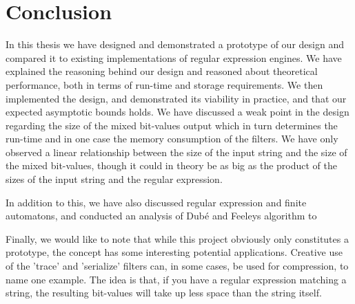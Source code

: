 \section{Conclusion}
\label{sec:conclusion}

In this thesis we have designed and demonstrated a prototype of our design and
compared it to existing implementations of regular expression
engines. We have explained the reasoning behind our design and reasoned about 
theoretical performance, both in terms of run-time and storage requirements. We then
implemented the design, and demonstrated its viability in practice, and that our expected asymptotic bounds holds. 
We have discussed a weak point in the design regarding the size of
the mixed bit-values output which in turn determines the run-time and in
one case the memory consumption of the filters. We have only observed
a linear relationship between the size of the input string and the
size of the mixed bit-values, though it could in theory be as big as
the product of the sizes of the input string and the regular
expression. 

In addition to this, we have also discussed regular expression and finite automatons, and conducted an analysis of Dub\'{e} and Feeleys algorithm to 

Finally, we would like to note that while this project obviously only constitutes a prototype, the concept has some interesting potential applications. Creative use of the 'trace' and 'serialize' filters can, in some cases, be used for compression, to name one example. The idea is that, if you have a regular expression
matching a string, the resulting bit-values will take up less space than the string itself. 
